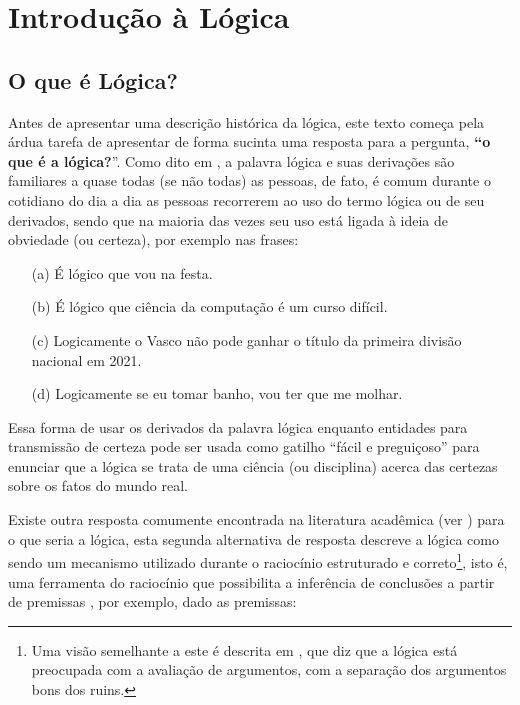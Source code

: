 \chapter{Introdução à Lógica}\label{cap:IntroducaoLogica}

\section{O que é Lógica?}\label{sec:O-que-e-Logica}

Antes de apresentar uma descrição histórica da lógica, este texto começa pela árdua tarefa de apresentar de forma sucinta uma resposta para a pergunta, \textbf{``o que é a lógica?}''. Como dito em \cite{BenjaV1, copi1981}, a palavra lógica e suas derivações são familiares a quase todas (se não todas) as pessoas, de fato, é comum durante o cotidiano do dia a dia as pessoas recorrerem ao uso do termo lógica ou de seu derivados, sendo que na maioria das vezes seu uso está ligada à ideia de obviedade (ou certeza), por exemplo nas frases:

\begin{itemize}
    \item[(a)] É lógico que vou na festa.
    \item[(b)] É lógico que ciência da computação é um curso difícil.
    \item[(c)] Logicamente o Vasco não pode ganhar o título da primeira divisão nacional em 2021.
    \item[(d)] Logicamente se eu tomar banho, vou ter que me molhar.
\end{itemize}

Essa forma de usar os derivados da palavra lógica enquanto entidades para transmissão de certeza pode ser usada como gatilho ``fácil e preguiçoso'' para enunciar que a lógica se trata de uma ciência (ou disciplina) acerca das certezas sobre os fatos do mundo real. 

Existe outra resposta comumente encontrada na literatura acadêmica (ver \cite{abe2002-logica, BenjaV1, joaoPavao2014}) para o que seria a lógica, esta segunda alternativa de resposta  descreve a lógica como sendo um mecanismo utilizado durante o raciocínio estruturado e correto\footnote{Uma visão semelhante a este é descrita em \cite{magnus2020}, que diz que a lógica está preocupada com a avaliação de argumentos, com a separação dos argumentos bons dos ruins.}, isto é, uma ferramenta do raciocínio que possibilita a inferência de conclusões a partir de premissas \cite{abe2002-logica, copi1981, hodges1997}, por exemplo, dado as premissas:

